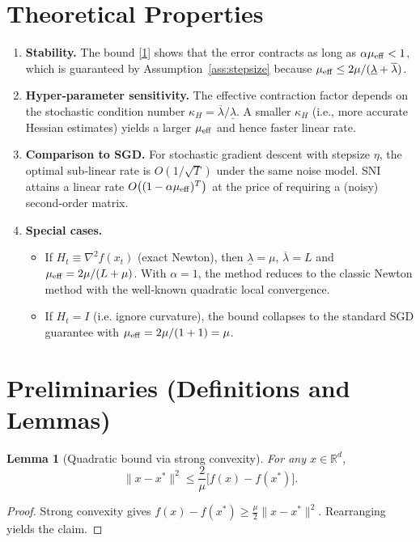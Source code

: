 \documentclass{article}
\newtheorem{lemma}{Lemma}
\begin{document}
\section*{Theoretical Properties}
\begin{enumerate}[label={\arabic*.}, leftmargin=*]
\item \textbf{Stability.}  The bound \eqref{1} shows that the error contracts
as long as $\alpha\mu_{\rm eff}<1$, which is guaranteed by
Assumption~\ref{ass:stepsize} because $\mu_{\rm eff}\le 2\mu/(\underline{\lambda}+\overline{\lambda})$.
\item \textbf{Hyper‑parameter sensitivity.}
    The effective contraction factor depends on the stochastic condition number
    $\kappa_{H}=\overline{\lambda}/\underline{\lambda}$.
    A smaller $\kappa_{H}$ (i.e., more accurate Hessian estimates) yields a larger
    $\mu_{\rm eff}$ and hence faster linear rate.
\item \textbf{Comparison to SGD.}
    For stochastic gradient descent with stepsize $\eta$, the optimal
    sub‑linear rate is $O(1/\sqrt{T})$ under the same noise model.
    SNI attains a linear rate $O\bigl((1-\alpha\mu_{\rm eff})^{T}\bigr)$
    at the price of requiring a (noisy) second‑order matrix.
\item \textbf{Special cases.}
    \begin{itemize}
        \item If $H_{t}\equiv\nabla^{2}f(x_{t})$ (exact Newton), then
              $\underline{\lambda}=\mu$, $\overline{\lambda}=L$ and
              $\mu_{\rm eff}=2\mu/(L+\mu)$.  With $\alpha=1$, the method reduces to the
              classic Newton method with the well‑known quadratic local convergence.
        \item If $H_{t}=I$ (i.e. ignore curvature), the bound collapses to the
              standard SGD guarantee with $\mu_{\rm eff}=2\mu/(1+1)=\mu$.
    \end{itemize}
\end{enumerate}
\section*{Preliminaries (Definitions and Lemmas)}
\begin{lemma}[Quadratic bound via strong convexity]\label{lem:quad}
For any $x\in\mathbb{R}^{d}$,
\[
\|x-x^{*}\|^{2}\le\frac{2}{\mu}\bigl[f(x)-f(x^{*})\bigr].
\]
\end{lemma}
\begin{proof}
Strong convexity gives
$f(x)-f(x^{*})\ge\frac{\mu}{2}\|x-x^{*}\|^{2}$.
Rearranging yields the claim. \hfill\qedsymbol
\end{proof}
\end{document}
